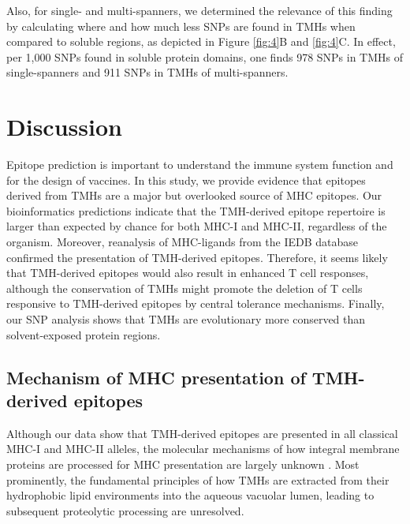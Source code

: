 \documentclass[utf8]{frontiersSCNS} %
\begin{document}
Also, for single- and multi-spanners, we determined the
relevance of this finding by calculating where and how much less SNPs
are found in TMHs when compared to soluble regions, as
depicted in Figure \ref{fig:4}B 
and \ref{fig:4}C.
In effect, per 1,000 SNPs found in soluble protein domains, 
one finds 978 SNPs in TMHs 
of single-spanners
and 911 SNPs in TMHs of multi-spanners.

\section{Discussion}


Epitope prediction is important to understand the immune system function
and for the design of vaccines.
In this study, we provide evidence that epitopes
derived from TMHs are a major but overlooked source of MHC epitopes. 
Our bioinformatics predictions indicate that the TMH-derived epitope repertoire is larger than expected by chance for both MHC-I and MHC-II, regardless of the organism. Moreover, reanalysis of MHC-ligands from the IEDB database confirmed the presentation of TMH-derived epitopes. Therefore, it seems likely that TMH-derived epitopes would also result in enhanced T cell responses, although the conservation of TMHs might promote the deletion of T cells responsive to TMH-derived epitopes by central tolerance mechanisms. Finally, our SNP analysis shows that TMHs are evolutionary more conserved 
than solvent-exposed protein regions.

\subsection{Mechanism of MHC presentation of TMH-derived epitopes}

Although our data show that 
TMH-derived epitopes are presented in all classical MHC-I and MHC-II alleles, 
the molecular mechanisms of how integral membrane proteins are processed 
for MHC presentation are largely unknown \citep{bianchi2017}. 
Most prominently, the fundamental principles of 
how TMHs are extracted from their hydrophobic lipid environments 
into the aqueous vacuolar lumen, 
leading to subsequent proteolytic processing are unresolved. 
\end{document}
